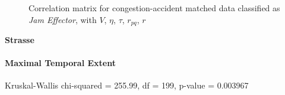 \begin{figure}[!ht]
	\centering
	\caption{Correlation matrix for congestion-accident matched data classified as \textit{Jam Effector}, with $V$, $\eta$, $\tau$, $r_{pq}$, $r$}
	\label{img:correlation_matrix_selected_effector_cramers}
\end{figure}

\large
\centerline{\textbf{Strasse}}
\normalsize

\paragraph{Maximal Temporal Extent}
Kruskal-Wallis chi-squared = 255.99, df = 199, p-value = 0.003967

